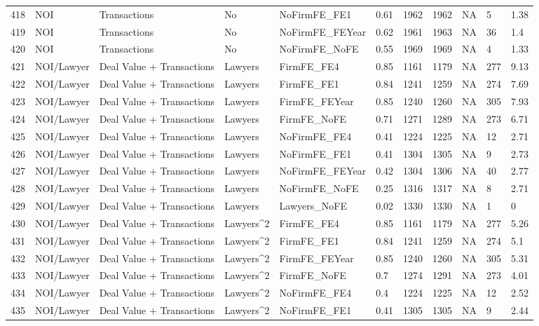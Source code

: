 \documentclass{article}
\begin{document}
\begin{table}[H]
\begin{tabular}{rllllllllll}
  418 & NOI & Transactions & No & NoFirmFE\_FE1 & 0.61 & 1962 & 1962 & NA & 5 & 1.38 \\
  419 & NOI & Transactions & No & NoFirmFE\_FEYear & 0.62 & 1961 & 1963 & NA & 36 & 1.4 \\
  420 & NOI & Transactions & No & NoFirmFE\_NoFE & 0.55 & 1969 & 1969 & NA & 4 & 1.33 \\
  421 & NOI/Lawyer & Deal Value + Transactions & Lawyers & FirmFE\_FE4 & 0.85 & 1161 & 1179 & NA & 277 & 9.13 \\
  422 & NOI/Lawyer & Deal Value + Transactions & Lawyers & FirmFE\_FE1 & 0.84 & 1241 & 1259 & NA & 274 & 7.69 \\
  423 & NOI/Lawyer & Deal Value + Transactions & Lawyers & FirmFE\_FEYear & 0.85 & 1240 & 1260 & NA & 305 & 7.93 \\
  424 & NOI/Lawyer & Deal Value + Transactions & Lawyers & FirmFE\_NoFE & 0.71 & 1271 & 1289 & NA & 273 & 6.71 \\
  425 & NOI/Lawyer & Deal Value + Transactions & Lawyers & NoFirmFE\_FE4 & 0.41 & 1224 & 1225 & NA & 12 & 2.71 \\
  426 & NOI/Lawyer & Deal Value + Transactions & Lawyers & NoFirmFE\_FE1 & 0.41 & 1304 & 1305 & NA & 9 & 2.73 \\
  427 & NOI/Lawyer & Deal Value + Transactions & Lawyers & NoFirmFE\_FEYear & 0.42 & 1304 & 1306 & NA & 40 & 2.77 \\
  428 & NOI/Lawyer & Deal Value + Transactions & Lawyers & NoFirmFE\_NoFE & 0.25 & 1316 & 1317 & NA & 8 & 2.71 \\
  429 & NOI/Lawyer & Deal Value + Transactions & Lawyers & Lawyers\_NoFE & 0.02 & 1330 & 1330 & NA & 1 & 0 \\
  430 & NOI/Lawyer & Deal Value + Transactions & Lawyers^2 & FirmFE\_FE4 & 0.85 & 1161 & 1179 & NA & 277 & 5.26 \\
  431 & NOI/Lawyer & Deal Value + Transactions & Lawyers^2 & FirmFE\_FE1 & 0.84 & 1241 & 1259 & NA & 274 & 5.1 \\
  432 & NOI/Lawyer & Deal Value + Transactions & Lawyers^2 & FirmFE\_FEYear & 0.85 & 1240 & 1260 & NA & 305 & 5.31 \\
  433 & NOI/Lawyer & Deal Value + Transactions & Lawyers^2 & FirmFE\_NoFE & 0.7 & 1274 & 1291 & NA & 273 & 4.01 \\
  434 & NOI/Lawyer & Deal Value + Transactions & Lawyers^2 & NoFirmFE\_FE4 & 0.4 & 1224 & 1225 & NA & 12 & 2.52 \\
  435 & NOI/Lawyer & Deal Value + Transactions & Lawyers^2 & NoFirmFE\_FE1 & 0.41 & 1305 & 1305 & NA & 9 & 2.44 \\

\end{tabular}
\end{table}
\end{document}
